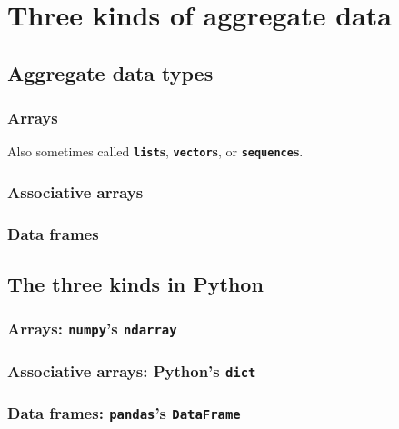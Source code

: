 
%

\chapter{Three kinds of aggregate data}

\section{Aggregate data types}

\subsection{Arrays}

Also sometimes called \textbf{\texttt{list}s}, \textbf{\texttt{vector}s}, or
\textbf{\texttt{sequence}s}.

\subsection{Associative arrays}

\subsection{Data frames}

\section{The three kinds in Python}

\subsection{Arrays: \texttt{numpy}'s \texttt{ndarray}}

\subsection{Associative arrays: Python's \texttt{dict}}

\subsection{Data frames: \texttt{pandas}'s \texttt{DataFrame}}


